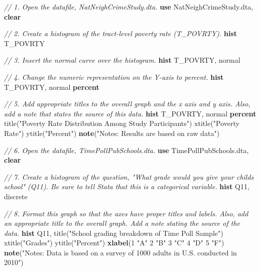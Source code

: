 \documentclass[
]{book}
\newenvironment{Shaded}{\begin{snugshade}}{\end{snugshade}}
\newcommand{\BaseNTok}[1]{\textcolor[rgb]{0.00,0.00,0.81}{#1}}
\newcommand{\CommentTok}[1]{\textcolor[rgb]{0.56,0.35,0.01}{\textit{#1}}}
\newcommand{\FunctionTok}[1]{\textcolor[rgb]{0.00,0.00,0.00}{#1}}
\newcommand{\KeywordTok}[1]{\textcolor[rgb]{0.13,0.29,0.53}{\textbf{#1}}}
\newcommand{\NormalTok}[1]{#1}
\newcommand{\StringTok}[1]{\textcolor[rgb]{0.31,0.60,0.02}{#1}}
\begin{document}
\begin{alert}

\begin{Shaded}
\begin{Highlighting}[]
\CommentTok{// 1.  Open the datafile, \textasciigrave{}NatNeighCrimeStudy.dta\textasciigrave{}.}
\KeywordTok{use}\NormalTok{ NatNeighCrimeStudy.dta, }\KeywordTok{clear}

\CommentTok{// 2.  Create a histogram of the tract{-}level poverty rate (\textasciigrave{}T\_POVRTY\textasciigrave{}).}
\KeywordTok{hist}\NormalTok{ T\_POVRTY}

\CommentTok{// 3.  Insert the normal curve over the histogram.}
\KeywordTok{hist}\NormalTok{ T\_POVRTY, }\FunctionTok{normal}

\CommentTok{// 4.  Change the numeric representation on the Y{-}axis to \textasciigrave{}percent\textasciigrave{}.}
\KeywordTok{hist}\NormalTok{ T\_POVRTY, }\FunctionTok{normal} \KeywordTok{percent}

\CommentTok{// 5.  Add appropriate titles to the overall graph and the x axis and y axis. Also, add a note that states the source of this data.}
\KeywordTok{hist}\NormalTok{ T\_POVRTY, }\FunctionTok{normal} \KeywordTok{percent} \BaseNTok{title}\NormalTok{(}\StringTok{"Poverty Rate Distribution Among Study Participants"}\NormalTok{) }\BaseNTok{xtitle}\NormalTok{(}\StringTok{"Poverty Rate"}\NormalTok{) }\BaseNTok{ytitle}\NormalTok{(}\StringTok{"Percent"}\NormalTok{) }\KeywordTok{note}\NormalTok{(}\StringTok{"Notes: Results are based on raw data"}\NormalTok{)}

\CommentTok{// 6.  Open the datafile, \textasciigrave{}TimePollPubSchools.dta\textasciigrave{}.}
\KeywordTok{use}\NormalTok{ TimePollPubSchools.dta, }\KeywordTok{clear}

\CommentTok{// 7.  Create a histogram of the question, "What grade would you give your child\textquotesingle{}s school" (\textasciigrave{}Q11\textasciigrave{}). Be sure to tell Stata that this is a categorical variable.}
\KeywordTok{hist}\NormalTok{ Q11, discrete}

\CommentTok{// 8.  Format this graph so that the axes have proper titles and labels. Also, add an appropriate title to the overall graph. Add a note stating the source of the data.}
\KeywordTok{hist}\NormalTok{ Q11, }\BaseNTok{title}\NormalTok{(}\StringTok{"School grading breakdown of Time Poll Sample"}\NormalTok{) }\BaseNTok{xtitle}\NormalTok{(}\StringTok{"Grades"}\NormalTok{) }\BaseNTok{ytitle}\NormalTok{(}\StringTok{"Percent"}\NormalTok{) }\KeywordTok{xlabel}\NormalTok{(1 }\StringTok{"A"}\NormalTok{ 2 }\StringTok{"B"}\NormalTok{ 3 }\StringTok{"C"}\NormalTok{ 4 }\StringTok{"D"}\NormalTok{ 5 }\StringTok{"F"}\NormalTok{) }\KeywordTok{note}\NormalTok{(}\StringTok{"Notes: Data is based on a survey of 1000 adults in U.S. conducted in 2010"}\NormalTok{)}
\end{Highlighting}
\end{Shaded}

\end{alert}
\end{document}
